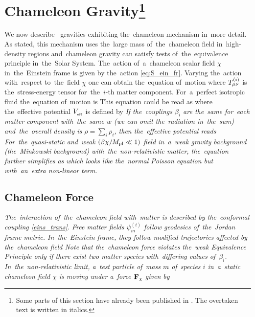 \section[Chameleon Gravity]{Chameleon Gravity\footnote{Some parts of this section have already been published in \textcite{mastersthesis_vrastil}. The overtaken text is written in italics.}}
\label{sec_cham}
We now describe \fR\ gravities exhibiting the~chameleon mechanism in~more detail. As stated, this mechanism uses the~large mass of~the~chameleon field in~high-density regions and~chameleon gravity can satisfy tests of~the~equivalence principle in~the~Solar System. The~action of~a~chameleon scalar field $\chi$ in~the~Einstein frame is given by the~action \eqref{eq:S_ein_fr}. Varying the~action with~respect to~the~field $\chi$ one can obtain the~equation of~motion
where $T^{(i)}_{\mu\nu}$ is the~stress-energy tensor for~the~$i$-th matter component. For~a~perfect isotropic fluid the~equation of~motion is
This equation could be read as
where the~effective potential $V_{_\text{\tiny eff}}$ is defined by
{\itshape
If the~couplings $\beta_i$ are the~same for~each matter component with~the~same $w$ (we can omit the~radiation in~the~sum) and~the~overall density is $\rho=\sum_i\rho_i$, then the~effective potential reads
For~the~quasi-static and~weak $(\beta\chi/M_{\text{\scriptsize pl}}\ll1)$ field in~a~weak gravity background (the~Minkowski background) with~the~non-relativistic matter, the~equation further simplifies as
which looks like the~normal Poisson equation but with~an~extra non-linear term.
}
\subsection{Chameleon Force}
{\itshape
The~interaction of~the~chameleon field with~matter is described by the~conformal coupling \eqref{eins_trans}. Free matter fields $\psi_m^{(i)}$ follow geodesics of~the~Jordan frame metric. In~the~Einstein frame, they follow modified trajectories affected by the~chameleon field \parencite{Waterhouse:2006wv}
Note that the~chameleon force violates the~weak Equivalence Principle only if there exist two matter species with~differing values of~$\beta_i$. In~the~non-relativistic limit, a~test particle of~mass $m$ of~species $i$ in~a~static chameleon field $\chi$ is moving under a~force $\mathbf{F}_\chi$ given by
}
